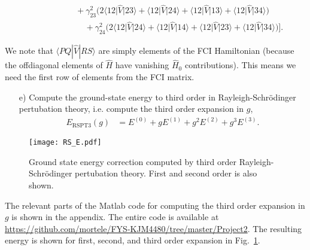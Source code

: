\documentclass[a4paper]{article}
\newcommand{\fig}[1]{Fig.\ \ref{fig:#1}}
\newcommand{\nn}{\nonumber}
\begin{document}
\begin{align}
& \ \ \ \ \ \ \ \ \ \ \ \ \ \ \ \ \ \ \ \ \ \ + \gamma_{23}^2\Big(2\big\langle 12 \big| \hat V \big| 23\big\rangle + \big\langle 12 \big| \hat V \big| 24\big\rangle + \big\langle 12 \big| \hat V \big| 13\big\rangle + \big\langle 12 \big| \hat V \big| 34\big\rangle \Big) \nn\\ 
& \ \ \ \ \ \ \ \ \ \ \ \ \ \ \ \ \ \ \ \ \ \ \ \ \ \ \ + \gamma_{24}^2\Big(2\big\langle 12 \big| \hat V \big| 24\big\rangle + \big\langle 12 \big| \hat V \big| 14\big\rangle + \big\langle 12 \big| \hat V \big| 23\big\rangle + \big\langle 12 \big| \hat V \big| 34\big\rangle \Big) \bigg].
\end{align}

We note that $\langle PQ|\hat V | RS\rangle $ are simply elements of the FCI Hamiltonian (because the offdiagonal elements of $\hat H$ have vanishing $\hat H_0$ contributions). This means we need the first row of elements from the FCI matrix.

\begin{exframe}
\begin{itemize}
  \item[e)] Compute the ground-state energy to third order in Rayleigh-Schrödinger pertubation theory, i.e. compute the third order expansion in $g$, 
  \begin{align}
  E_\text{RSPT3}(g) &= E^{(0)} + gE^{(1)} + g^2E^{(2)} + g^3E^{(3)}.
  \end{align}
\end{itemize}
\end{exframe}
\begin{figure}
\centering
\texttt{[image: RS\_E.pdf]}
\caption{Ground state energy correction computed by third order Rayleigh-Schrödinger pertubation theory. First and second order is also shown. \label{fig:6}}
\end{figure}
The relevant parts of the {\sc Matlab} code for computing the third order expansion in $g$ is shown in the appendix. The entire code is available at \url{https://github.com/mortele/FYS-KJM4480/tree/master/Project2}. The resulting energy is shown for first, second, and third order expansion in \fig{6}.
\end{document}
